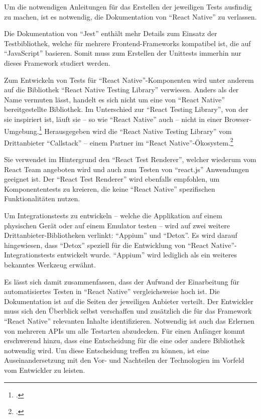 Um die notwendigen Anleitungen für das Erstellen der jeweiligen Tests ausfindig zu machen, ist es notwendig, die Dokumentation von \enquote{React Native} zu verlassen.

Die Dokumentation von \enquote{Jest} enthält mehr Details zum Einsatz der Testbibliothek, welche für mehrere Frontend-Frameworks kompatibel ist,
die auf \enquote{JavaScript} basieren.
Somit muss zum Erstellen der Unittests immerhin nur dieses Framework studiert werden.

Zum Entwickeln von Tests für \enquote{React Native}-Komponenten wird unter anderem auf die Bibliothek \enquote{React Native Testing Library} verwiesen.
Anders als der Name vermuten lässt, handelt es sich nicht um eine von \enquote{React Native} bereitgestellte Bibliothek.
Im Unterschied zur \enquote{React Testing Library}, von der sie inspiriert ist, läuft sie -- so wie \enquote{React Native} auch -- nicht in einer Browser-Umgebung.\footcite[Vgl.][]{NativeTestingLibraryIntroduction}
 Herausgegeben wird die \enquote{React Native Testing Library} vom Drittanbieter \enquote{Callstack} -- einem Partner im \enquote{React Native}-Ökosystem.\footcite[Vgl.][]{TheReactNativeEcosystem}

Sie verwendet im Hintergrund den \enquote{React Test Renderer}, welcher wiederum vom React Team angeboten wird und auch zum Testen von \enquote{react.js} Anwendungen geeignet ist.
Der \enquote{React Test Renderer} wird ebenfalls empfohlen, um Komponententests zu kreieren, die keine \enquote{React Native} spezifischen Funktionalitäten nutzen.

Um Integrationstests zu entwickeln -- welche die Applikation auf einem physischen Gerät oder auf einem Emulator testen -- wird auf zwei weitere Drittanbieter-Bibliotheken verlinkt:
\enquote{Appium} und \enquote{Detox}.
Es wird darauf hingewiesen, dass \enquote{Detox} speziell für die Entwicklung von \enquote{React Native}-Integrationstests entwickelt wurde.
\enquote{Appium} wird lediglich als ein weiteres bekanntes Werkzeug erwähnt.

Es lässt sich damit zusammenfassen, dass der Aufwand der Einarbeitung für automatisiertes Testen in \enquote{React Native} vergleichsweise hoch ist.
Die Dokumentation ist auf die Seiten der jeweiligen Anbieter verteilt.
Der Entwickler muss sich den Überblick selbst verschaffen und zusätzlich die für das Framework \enquote{React Native} relevanten Inhalte identifizieren.
Notwendig ist auch das Erlernen von mehreren APIs um alle Testarten abzudecken.
Für einen Anfänger kommt erschwerend hinzu, dass eine Entscheidung für die eine oder andere Bibliothek notwendig wird.
Um diese Entscheidung treffen zu können, ist eine Auseinandersetzung mit den Vor- und Nachteilen der Technologien im Vorfeld vom Entwickler zu leisten.

